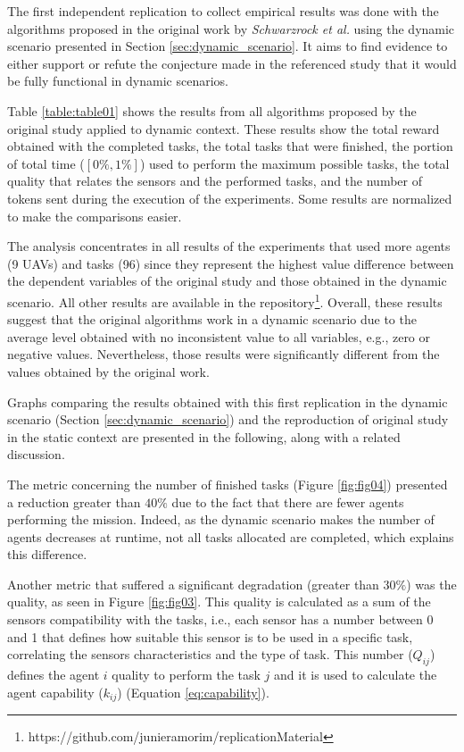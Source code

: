 
The first independent replication to collect empirical results was done with the algorithms proposed in the original work by \textit{Schwarzrock et al.}\cite{MAS07} using the dynamic scenario presented in Section \ref{sec:dynamic_scenario}. It aims to find evidence to either support or refute the conjecture made in the referenced study that it would be fully functional in dynamic scenarios. 

Table \ref{table:table01} shows the results from all algorithms proposed by the original study \cite{MAS07} applied to dynamic context. These results show the total reward obtained with the completed tasks, the total tasks that were finished, the portion of total time ($[0\%,1\%]$) used to perform the maximum possible tasks, the total quality that relates the sensors and the performed tasks, and the number of tokens sent during the execution of the experiments. Some results are normalized to make the comparisons easier. 



The analysis concentrates in all results of the experiments that used more agents (9 UAVs) and tasks (96) since they represent the highest value difference between the dependent variables of the original study and those obtained in the dynamic scenario. All other results are available in the repository\footnote{https://github.com/junieramorim/replicationMaterial}. Overall, these results suggest that the original algorithms work in a dynamic scenario due to the average level obtained with no inconsistent value to all variables, e.g., zero or negative values. Nevertheless, those results were significantly different from the values obtained by the original work.

Graphs comparing the results obtained with this first replication in the dynamic scenario (Section \ref{sec:dynamic_scenario}) and the reproduction of original study in the static context are presented in the following, along with a related discussion.

The metric concerning the number of finished tasks (Figure \ref{fig:fig04}) presented a reduction greater than $40\%$ due to the fact that there are fewer agents performing the mission. Indeed, as the dynamic scenario makes the number of agents decreases at runtime, not all tasks allocated are completed, which explains this difference. 

Another metric that suffered a significant degradation (greater than $30\%$) was the quality, as seen in Figure \ref{fig:fig03}. This quality is calculated as a sum of the sensors compatibility with the tasks, i.e., each sensor has a number between 0 and 1 that defines how suitable this sensor is to be used in a specific task, correlating the sensors characteristics and the type of task. This number ($Q_{ij}$) defines the agent $i$ quality to perform the task $j$ and it is used to calculate the agent capability ($k_{ij}$) (Equation \ref{eq:capability}).

